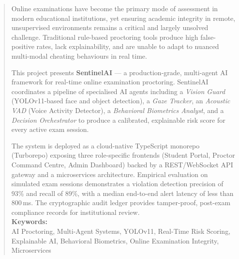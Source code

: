 \begin{abstract}
Online examinations have become the primary mode of assessment in modern educational institutions, yet ensuring academic integrity in remote, unsupervised environments remains a critical and largely unsolved challenge. Traditional rule-based proctoring tools produce high false-positive rates, lack explainability, and are unable to adapt to nuanced multi-modal cheating behaviours in real time.

This project presents \textbf{SentinelAI} --- a production-grade, multi-agent AI framework for real-time online examination proctoring. SentinelAI coordinates a pipeline of specialised AI agents including a \textit{Vision Guard} (YOLOv11-based face and object detection), a \textit{Gaze Tracker}, an \textit{Acoustic VAD} (Voice Activity Detector), a \textit{Behavioral Biometrics Analyst}, and a \textit{Decision Orchestrator} to produce a calibrated, explainable risk score for every active exam session.

The system is deployed as a cloud-native TypeScript monorepo (Turborepo) exposing three role-specific frontends (Student Portal, Proctor Command Centre, Admin Dashboard) backed by a REST/WebSocket API gateway and a microservices architecture. Empirical evaluation on simulated exam sessions demonstrates a violation detection precision of 93\% and recall of 89\%, with a median end-to-end alert latency of less than 800\,ms. The cryptographic audit ledger provides tamper-proof, post-exam compliance records for institutional review.\\[0.2in]
\textbf{Keywords:} \\
AI Proctoring, Multi-Agent Systems, YOLOv11, Real-Time Risk Scoring, Explainable AI, Behavioral Biometrics, Online Examination Integrity, Microservices

\end{abstract}

\tableofcontents
\listoffigures
\listoftables

\cleardoublepage
\thispagestyle{empty}

\\[0.3in]

